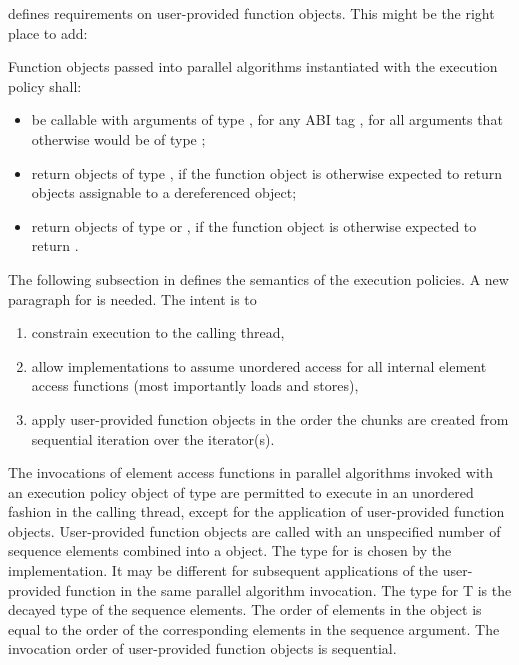\bigskip
\citep[§25.3.2]{N4842} defines requirements on user-provided function objects.
This might be the right place to add:
\begin{wgText}
  \setcounter{Paras}{1}
  \color{WgAdd}
  \pnum Function objects passed into parallel algorithms instantiated with the \simdEP execution policy shall:
  \begin{itemize}
    \item be callable with arguments of type , for any ABI tag , for all arguments that otherwise would be of type ;
    \item return objects of type , if the function object is otherwise expected to return objects assignable to a dereferenced  object;
    \item return objects of type  or \bool, if the function object is otherwise expected to return \bool.
  \end{itemize}
\end{wgText}

The following subsection in \citep[§25.3.3]{N4842} defines the semantics of the execution policies.
A new paragraph for \simdEP is needed.
The intent is to
\begin{enumerate}
  \item constrain execution to the calling thread,
  \item allow implementations to assume unordered access for all internal element access functions (most importantly loads and stores),
  \item apply user-provided function objects in the order the \simd chunks are created from sequential iteration over the iterator(s).
\end{enumerate}
\begin{wgText}
  \setcounter{Paras}{7}%
  \color{WgAdd}
  \pnum
  The invocations of element access functions in parallel algorithms invoked with an execution policy object of type \simdEPT are permitted to execute in an unordered fashion in the calling thread, except for the application of user-provided function objects.
  User-provided function objects are called with an unspecified number of sequence elements combined into a \simd[<T, Abi>] object.
  The type for  is chosen by the implementation.
  It may be different for subsequent applications of the user-provided function in the same parallel algorithm invocation.
  The type for \type T is the decayed type of the sequence elements.
  The order of elements in the \simd object is equal to the order of the corresponding elements in the sequence argument.
  The invocation order of user-provided function objects is sequential.
\end{wgText}

